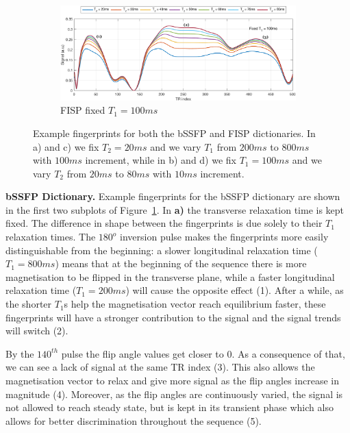 \begin{figure}[ht]
    \begin{subfigure}[b]{.75\textwidth}
        \includegraphics[width=\textwidth]{images/mrf/mrfDictionaryFISPbDesc}
        \caption{FISP fixed $T_1 = 100ms$}
    \end{subfigure}
    
    \caption{Example fingerprints for both the bSSFP and FISP dictionaries. In a) and c) we fix $T_2 = 20ms$ and we vary $T_1$ from $200ms$ to $800ms$ with $100ms$ increment, while in b) and d) we fix $T_1 = 100ms$ and we vary $T_2$ from $20ms$ to $80ms$ with $10ms$ increment.}
    \label{fig:mrfDictionaries}
\end{figure}

\hfill

\textbf{bSSFP Dictionary.} 
Example fingerprints for the bSSFP dictionary are shown in the first two subplots of Figure~\ref{fig:mrfDictionaries}.
In \textbf{a)} the transverse relaxation time is kept fixed. 
The difference in shape between the fingerprints is due solely to their $T_1$ relaxation times.
The $180^o$ inversion pulse makes the fingerprints more easily distinguishable from the beginning:
a slower longitudinal relaxation time ($T_1 = 800ms$) means that at the beginning of the sequence there is more magnetisation to be flipped in the transverse plane, while a faster longitudinal relaxation time ($T_1 = 200ms$) will cause the opposite effect (1).
After a while, as the shorter $T_1$s help the magnetisation vector reach equilibrium faster, these fingerprints will have a stronger contribution to the signal and the signal trends will switch (2).

\hfill

By the $140^{th}$ pulse the flip angle values get closer to $0$. 
As a consequence of that, we can see a lack of signal at the same TR index (3).
This also allows the magnetisation vector to relax and give more signal as the flip angles increase in magnitude (4).
Moreover, as the flip angles are continuously varied, the signal is not allowed to reach steady state, but is kept in its transient phase which also allows for better discrimination throughout the sequence (5).

